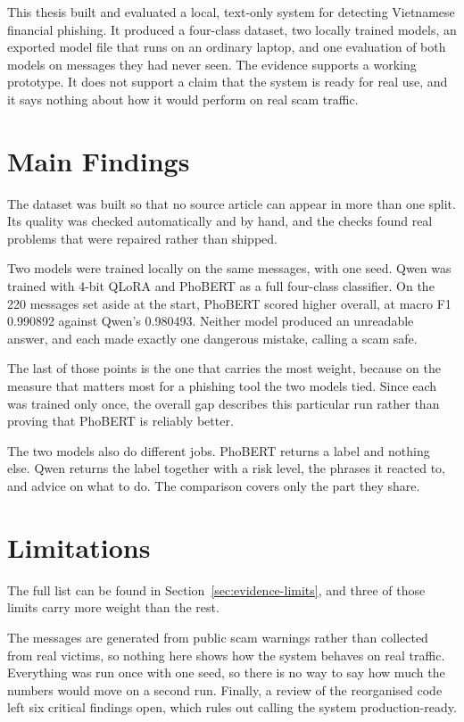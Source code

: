 This thesis built and evaluated a local, text-only system for detecting Vietnamese financial phishing. It produced a four-class dataset, two locally trained models, an exported model file that runs on an ordinary laptop, and one evaluation of both models on messages they had never seen. The evidence supports a working prototype. It does not support a claim that the system is ready for real use, and it says nothing about how it would perform on real scam traffic.

\section{Main Findings}

The dataset was built so that no source article can appear in more than one split. Its quality was checked automatically and by hand, and the checks found real problems that were repaired rather than shipped.

Two models were trained locally on the same messages, with one seed. Qwen was trained with 4-bit QLoRA and PhoBERT as a full four-class classifier. On the 220 messages set aside at the start, PhoBERT scored higher overall, at macro F1 0.990892 against Qwen's 0.980493. Neither model produced an unreadable answer, and each made exactly one dangerous mistake, calling a scam safe.

The last of those points is the one that carries the most weight, because on the measure that matters most for a phishing tool the two models tied. Since each was trained only once, the overall gap describes this particular run rather than proving that PhoBERT is reliably better.

The two models also do different jobs. PhoBERT returns a label and nothing else. Qwen returns the label together with a risk level, the phrases it reacted to, and advice on what to do. The comparison covers only the part they share.

\section{Limitations}

The full list can be found in Section~\ref{sec:evidence-limits}, and three of those limits carry more weight than the rest.

The messages are generated from public scam warnings rather than collected from real victims, so nothing here shows how the system behaves on real traffic. Everything was run once with one seed, so there is no way to say how much the numbers would move on a second run. Finally, a review of the reorganised code left six critical findings open, which rules out calling the system production-ready.

